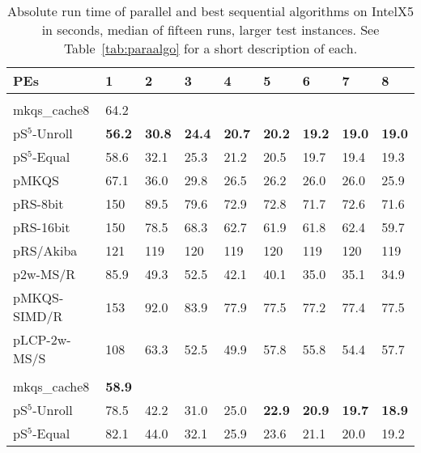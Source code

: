 \documentclass[a4paper]{myjournal}
\begin{document}
\begin{table}\centering\small
\caption{Absolute run time of parallel and best sequential algorithms on IntelX5 in seconds, median of fifteen runs, larger test instances. See Table~\ref{tab:paraalgo} for a short description of each.}\label{tab:absrun-IntelX5}
\begin{tabularx}{\linewidth}{l|*{8}{>{\hfill}X}|@{}}
PEs          & 1   & 2 & 3 & 4 & 5 & 6 & 7 & 8                                                                                      \\ \hline
& \multicolumn{8}{l|}{\textbf{URLs}, $n = 132\,\text{M}$, $N = 8\,\text{Gi}$, $\frac{D}{N} = 92.6\,\%$} \\ \cline{2-9}
mkqs\_cache8 & 64.2 &  &  &  &  &  &  &  \\
pS$^5$-Unroll & \bf 56.2 & \bf 30.8 & \bf 24.4 & \bf 20.7 & \bf 20.2 & \bf 19.2 & \bf 19.0 & \bf 19.0 \\
 pS$^5$-Equal &     58.6 &     32.1 &     25.3 &     21.2 &     20.5 &     19.7 &     19.4 &     19.3 \\
        pMKQS &     67.1 &     36.0 &     29.8 &     26.5 &     26.2 &     26.0 &     26.0 &     25.9 \\
     pRS-8bit &      150 &     89.5 &     79.6 &     72.9 &     72.8 &     71.7 &     72.6 &     71.6 \\
    pRS-16bit &      150 &     78.5 &     68.3 &     62.7 &     61.9 &     61.8 &     62.4 &     59.7 \\
    pRS/Akiba &      121 &      119 &      120 &      119 &      120 &      119 &      120 &      119 \\
     p2w-MS/R &     85.9 &     49.3 &     52.5 &     42.1 &     40.1 &     35.0 &     35.1 &     34.9 \\
 pMKQS-SIMD/R &      153 &     92.0 &     83.9 &     77.9 &     77.5 &     77.2 &     77.4 &     77.5 \\
 pLCP-2w-MS/S &      108 &     63.3 &     52.5 &     49.9 &     57.8 &     55.8 &     54.4 &     57.7 \\ \hline
& \multicolumn{8}{l|}{\textbf{Random}, $n = 307\,\text{M}$, $N = 3\,\text{Gi}$, $\frac{D}{N} = 42.8\,\%$} \\ \cline{2-9}
mkqs\_cache8 & \bf 58.9 &  &  &  &  &  &  &  \\
pS$^5$-Unroll & 78.5 &     42.2 &     31.0 &     25.0 & \bf 22.9 & \bf 20.9 & \bf 19.7 & \bf 18.9 \\
 pS$^5$-Equal & 82.1 &     44.0 &     32.1 &     25.9 &     23.6 &     21.1 &     20.0 &     19.2 \\

\end{tabularx}
\end{table}
\end{document}
